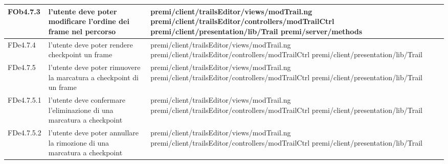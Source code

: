 \begin{longtable}{|l|p{5cm}|p{7cm}|}
\hline
FOb4.7.3 & l'utente deve poter modificare l'ordine dei frame nel percorso & \hspace{0pt}premi/client/trailsEditor/views/modTrail.ng \linebreak \linebreak premi/client/trailsEditor/controllers/modTrailCtrl \linebreak \linebreak premi/client/presentation/lib/Trail  \linebreak \linebreak premi/server/methods \\
\hline
FDe4.7.4 & l'utente deve poter rendere checkpoint un frame & \hspace{0pt}premi/client/trailsEditor/views/modTrail.ng \linebreak \linebreak premi/client/trailsEditor/controllers/modTrailCtrl \linebreak \linebreak premi/client/presentation/lib/Trail \\
\hline
FDe4.7.5 & l'utente deve poter rimuovere la marcatura a checkpoint di un frame & \hspace{0pt}premi/client/trailsEditor/views/modTrail.ng \linebreak \linebreak premi/client/trailsEditor/controllers/modTrailCtrl \linebreak \linebreak premi/client/presentation/lib/Trail \\
\hline
FDe4.7.5.1 & l'utente deve confermare l'eliminazione di una marcatura a checkpoint & \hspace{0pt}premi/client/trailsEditor/views/modTrail.ng \linebreak \linebreak premi/client/trailsEditor/controllers/modTrailCtrl \linebreak \linebreak premi/client/presentation/lib/Trail \\
\hline
FDe4.7.5.2 & l'utente deve poter annullare la rimozione di una marcatura a checkpoint & \hspace{0pt}premi/client/trailsEditor/views/modTrail.ng \linebreak \linebreak premi/client/trailsEditor/controllers/modTrailCtrl \linebreak \linebreak premi/client/presentation/lib/Trail \\

\end{longtable}
